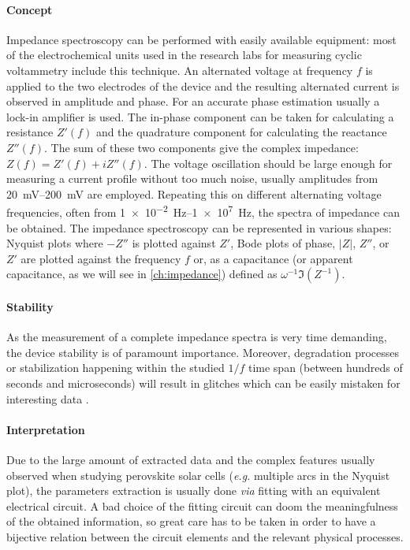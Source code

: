 \paragraph{Concept}
Impedance spectroscopy can be performed with easily available equipment: most of the electrochemical units used in the research labs for measuring cyclic voltammetry include this technique.
An alternated voltage at frequency $f$ is applied to the two electrodes of the device and the resulting alternated current is observed in amplitude and phase.
For an accurate phase estimation usually a lock-in amplifier is used.
The in-phase component can be taken for calculating a resistance $Z'(f)$ and the quadrature component for calculating the reactance $Z''(f)$.
The sum of these two components give the complex impedance: $Z(f) = Z'(f) + iZ''(f)$.
The voltage oscillation should be large enough for measuring a current profile without too much noise, usually amplitudes from \SIrange{20}{200}{\mV} are employed.
Repeating this on different alternating voltage frequencies, often from \SIrange{1e-2}{1e7}{\Hz}, the spectra of impedance can be obtained.
The impedance spectroscopy can be represented in various shapes: Nyquist plots where $-Z''$ is plotted against $Z'$, Bode plots of phase, $|Z|$, $Z''$, or $Z'$ are plotted against the frequency $f$ or, as a capacitance (or apparent capacitance, as we will see in \cref{ch:impedance}) defined as $\omega^{-1}\Im(Z^{-1})$.

\paragraph{Stability}
As the measurement of a complete impedance spectra is very time demanding, the device stability is of paramount importance.
Moreover, degradation processes or stabilization happening within the studied $1/f$ time span (between hundreds of seconds and microseconds) will result in glitches which can be easily mistaken for interesting data \cite{Jacobs2018,Moia2019}.

\paragraph{Interpretation}
Due to the large amount of extracted data and the complex features usually observed when studying perovskite solar cells (\textit{e.g.} multiple arcs in the Nyquist plot), the parameters extraction is usually done \textit{via} fitting with an equivalent electrical circuit.
A bad choice of the fitting circuit can doom the meaningfulness of the obtained information, so great care has to be taken in order to have a bijective relation between the circuit elements and the relevant physical processes. 

